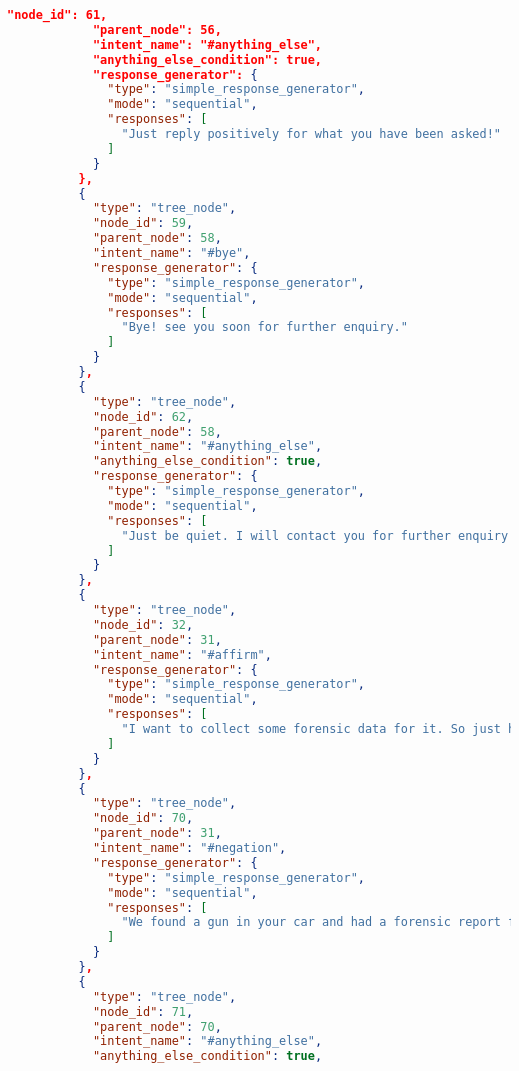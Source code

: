 \begin{appendix}
\begin{lstlisting}[language=json, firstnumber=1]
            "node_id": 61,
            "parent_node": 56,
            "intent_name": "#anything_else",
            "anything_else_condition": true,
            "response_generator": {
              "type": "simple_response_generator",
              "mode": "sequential",
              "responses": [
                "Just reply positively for what you have been asked!"
              ]
            }
          },
          {
            "type": "tree_node",
            "node_id": 59,
            "parent_node": 58,
            "intent_name": "#bye",
            "response_generator": {
              "type": "simple_response_generator",
              "mode": "sequential",
              "responses": [
                "Bye! see you soon for further enquiry."
              ]
            }
          },
          {
            "type": "tree_node",
            "node_id": 62,
            "parent_node": 58,
            "intent_name": "#anything_else",
            "anything_else_condition": true,
            "response_generator": {
              "type": "simple_response_generator",
              "mode": "sequential",
              "responses": [
                "Just be quiet. I will contact you for further enquiry later."
              ]
            }
          },
          {
            "type": "tree_node",
            "node_id": 32,
            "parent_node": 31,
            "intent_name": "#affirm",
            "response_generator": {
              "type": "simple_response_generator",
              "mode": "sequential",
              "responses": [
                "I want to collect some forensic data for it. So just hand it over to me. My owner will collect it from you soon."
              ]
            }
          },
          {
            "type": "tree_node",
            "node_id": 70,
            "parent_node": 31,
            "intent_name": "#negation",
            "response_generator": {
              "type": "simple_response_generator",
              "mode": "sequential",
              "responses": [
                "We found a gun in your car and had a forensic report for it. And your fingerprints on that gun matches the one on the cash register. So you are being arrested for a robbery. You have a right to remain silent. Anything you say now will be used against you in the court of law. Hope you will enjoy your imprisonment. Hope to not see you again!"
              ]
            }
          },
          {
            "type": "tree_node",
            "node_id": 71,
            "parent_node": 70,
            "intent_name": "#anything_else",
            "anything_else_condition": true,

\end{lstlisting}
\end{appendix}
